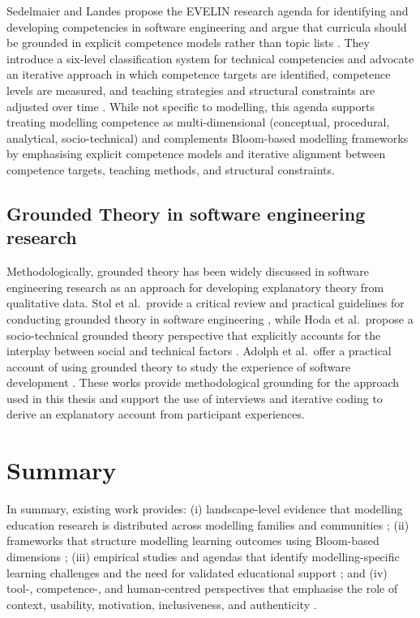 Sedelmaier and Landes propose the EVELIN research agenda for identifying and developing competencies in software engineering and argue that curricula should be grounded in explicit competence models rather than topic lists \cite{sedelmaier2013research}. They introduce a six-level classification system for technical competencies and advocate an iterative approach in which competence targets are identified, competence levels are measured, and teaching strategies and structural constraints are adjusted over time \cite{sedelmaier2013research}. While not specific to modelling, this agenda supports treating modelling competence as multi-dimensional (conceptual, procedural, analytical, socio-technical) and complements Bloom-based modelling frameworks by emphasising explicit competence models and iterative alignment between competence targets, teaching methods, and structural constraints.

\subsection{Grounded Theory in software engineering research}
\label{subsec:rw_gt}

Methodologically, grounded theory has been widely discussed in software engineering research as an approach for developing explanatory theory from qualitative data. Stol et al.\ provide a critical review and practical guidelines for conducting grounded theory in software engineering \cite{stol2016grounded}, while Hoda et al.\ propose a socio-technical grounded theory perspective that explicitly accounts for the interplay between social and technical factors \cite{hoda2018socio}. Adolph et al.\ offer a practical account of using grounded theory to study the experience of software development \cite{adolph2011using}. These works provide methodological grounding for the approach used in this thesis and support the use of interviews and iterative coding to derive an explanatory account from participant experiences.

\section{Summary}
\label{sec:rw_summary_positioning}

In summary, existing work provides: (i) landscape-level evidence that modelling education research is distributed across modelling families and communities \cite{maslov2025conceptual}; (ii) frameworks that structure modelling learning outcomes using Bloom-based dimensions \cite{bogdanova2019camelot,bogdanova2017domain,bork2019framework}; (iii) empirical studies and agendas that identify modelling-specific learning challenges and the need for validated educational support \cite{istar-learning,bpmn-education}; and (iv) tool-, competence-, and human-centred perspectives that emphasise the role of context, usability, motivation, inclusiveness, and authenticity \cite{grassl2026dei,holmes2018dimensions,liebel2017model,sedelmaier2013research}.

